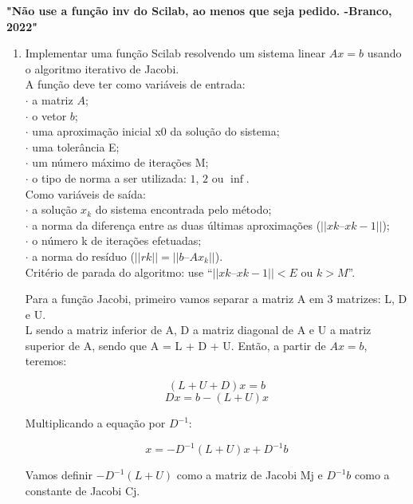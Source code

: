 \documentclass[leqno]{article}
\numberwithin{equation}{section}
\begin{document}
	{\normalsize \textbf{"Não use a função inv do Scilab, ao menos que seja pedido. -Branco, 2022"}}
	
	\begin{enumerate}
		
		
		\item  Implementar uma função Scilab resolvendo um sistema linear
		$Ax = b$ usando o algoritmo iterativo de Jacobi.\\
		A função deve ter como variáveis de entrada:\\
		$\cdot$ a matriz $A$;\\
		$\cdot$ o vetor $b$;\\
		$\cdot$ uma aproximação inicial x0 da solução do sistema;\\
		$\cdot$ uma tolerância E;\\
		$\cdot$ um número máximo de iterações M;\\
		$\cdot$ o tipo de norma a ser utilizada: $1$, $2$ ou $\inf$.\\
		Como variáveis de saída:\\
		$\cdot$ a solução $x_k$ do sistema encontrada pelo método;\\
		$\cdot$ a norma da diferença entre as duas últimas aproximações
		($||xk – xk-1||$);\\
		$\cdot$ o número k de iterações efetuadas;\\
		$\cdot$ a norma do resíduo ($||rk|| = ||b – Ax_k||$).\\
		Critério de parada do algoritmo: use “$||xk – xk-1||<E$ ou $k>M$”.\\
		
		\begin{sol}
			
	Para a função Jacobi, primeiro vamos separar a matriz A em 3 matrizes: L, D e U. \\
	L sendo a matriz inferior de A, D a matriz diagonal de A e U a matriz superior de A, sendo que A = L + D + U. Então, a partir de $Ax = b$, teremos:
	
	$$(L + U + D)x = b$$
	$$Dx = b - (L + U)x$$
	
	Multiplicando a equação por $D^{-1}$:
	
	$$x = -D^{-1}(L+U)x + D^{-1}b$$
	
	Vamos definir $-D^{-1}(L+U)$ como a matriz de Jacobi Mj e $D^{-1}b$ como a constante de Jacobi Cj.
	

\end{sol}
\end{enumerate}
\end{document}
